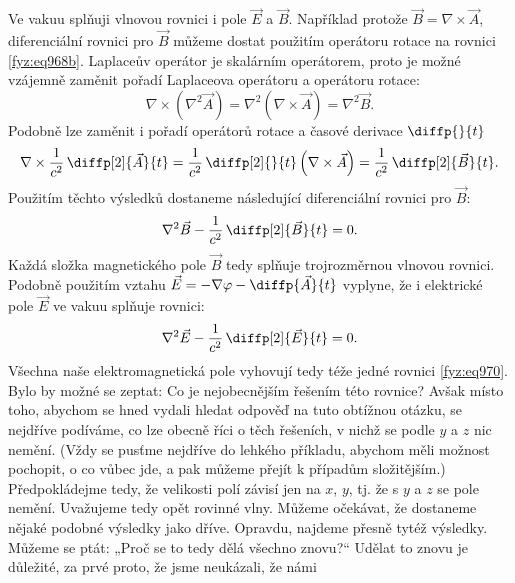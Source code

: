     Ve vakuu splňuji vlnovou rovnici i pole \(\vec{E}\) a \(\vec{B}\). Například protože \(\vec{B}=
    \nabla\times\vec{A}\), diferenciální rovnici pro \(\vec{B}\) můžeme dostat použitím operátoru
    rotace na rovnici \eqref{fyz:eq968b}. Laplaceův operátor je skalárním operátorem, proto je možné
    vzájemně zaměnit pořadí Laplaceova operátoru a operátoru rotace:
    \begin{equation*}
      \nabla\times\left(\nabla^2\vec{A}\right) 
        = \nabla^2\left(\nabla\times\vec{A}\right) 
        = \nabla^2\vec{B}.
    \end{equation*} 
    Podobně lze zaměnit i pořadí operátorů rotace a časové derivace \(\diffp{}{t}\)
    \begin{equation*}
      \nabla\times{\dfrac{1}{c^2}\,\diffp[2]{\vec{A}}{t}}
        = \dfrac{1}{c^2}\,\diffp[2]{}{t}\left(\nabla\times\vec{A}\right)
        = \dfrac{1}{c^2}\,\diffp[2]{\vec{B}}{t}.
    \end{equation*}
    Použitím těchto výsledků dostaneme následující diferenciální rovnici pro \(\vec{B}\):
    \begin{equation}\label{fyz:eq971}
      \nabla^2\vec{B} - \frac{1}{c^2}\,\diffp[2]{\vec{B}}{t}=0.
    \end{equation}
    Každá složka magnetického pole \(\vec{B}\) tedy splňuje trojrozměrnou vlnovou rovnici. Podobně
    použitím vztahu \(\vec{E}=-\nabla{\varphi}-\diffp{\vec{A}}{t}\) vyplyne, že i elektrické pole
    \(\vec{E}\) ve vakuu splňuje rovnici:
    \begin{equation}\label{fyz:eq972}
      \nabla^2\vec{E} - \frac{1}{c^2}\,\diffp[2]{\vec{E}}{t}=0.
    \end{equation}
    Všechna naše elektromagnetická pole vyhovují tedy téže jedné rovnici \eqref{fyz:eq970}. Bylo by
    možné se zeptat: Co je nejobecnějším řešením této rovnice? Avšak místo toho, abychom se hned
    vydali hledat odpověď na tuto obtížnou otázku, se nejdříve podíváme, co lze obecně říci o těch
    řešeních, v nichž se podle \(y\) a \(z\) nic nemění. (Vždy se pusťme nejdříve do lehkého
    příkladu, abychom měli možnost pochopit, o co vůbec jde, a pak můžeme přejít k případům
    složitějším.) Předpokládejme tedy, že velikosti polí závisí jen na \(x\), \(y\), tj. že s \(y\)
    a \(z\) se pole nemění. Uvažujeme tedy opět rovinné vlny. Můžeme očekávat, že dostaneme nějaké
    podobné výsledky jako dříve. Opravdu, najdeme přesně tytéž výsledky. Můžeme se ptát: „Proč se to
    tedy dělá všechno znovu?“ Udělat to znovu je důležité, za prvé proto, že jsme neukázali, že námi
